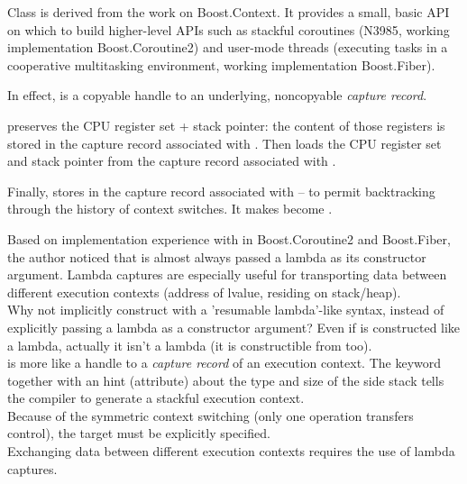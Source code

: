 Class \ectx is derived from the work on Boost.Context\cite{bcontext}. It
provides a small, basic API on which to build higher-level APIs such as
stackful coroutines (N3985\cite{N3985}, working implementation
Boost.Coroutine2\cite{bcoroutine2}) and user-mode threads (executing tasks in
a cooperative multitasking environment, working implementation
Boost.Fiber\cite{bfiber}).

In effect,  is a copyable handle to an underlying,
noncopyable \emph{capture record}.

 preserves the CPU register set + stack pointer:
the content of those registers is stored in the capture record
associated with . Then 
loads the CPU register set and stack pointer from the capture record
associated with .

Finally, 
stores  in the capture record
associated with  -- to permit backtracking through the history of
context switches. It makes  become .

Based on implementation experience with  in
Boost.Coroutine2\cite{bcoroutine2} and Boost.Fiber\cite{bfiber}, the author
noticed that  is almost always passed a lambda as its
constructor argument. Lambda captures are especially useful for transporting
data between different execution contexts (address of lvalue, residing on
stack/heap).\\
Why not implicitly construct \ectx with a 'resumable lambda'-like
syntax\cite{N4244}, instead of explicitly passing a lambda as a constructor
argument? Even if \ectx is constructed like a lambda, actually it isn't a
lambda (it is constructible from \ectxcurrent too).\\
\ectx is more like a handle to a \emph{capture record} of an execution
context.
The keyword \resumable together with an hint (attribute) about the type and size
of the side stack tells the compiler to generate a stackful execution context.\\
Because of the symmetric context switching (only one operation transfers
control), the target  must be explicitly specified.\\
Exchanging data between different execution contexts requires the use of lambda
captures.

